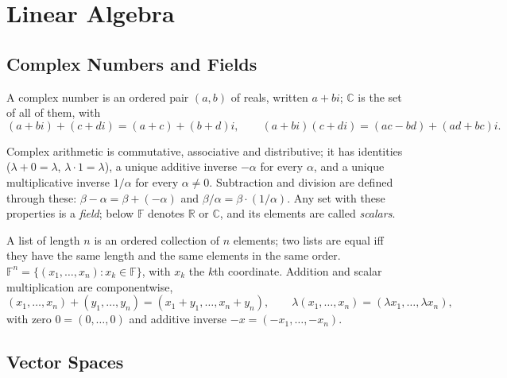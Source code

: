 \chapter{Linear Algebra}

\section{Complex Numbers and Fields}

\begin{definition}
A complex number is an ordered pair $(a,b)$ of reals, written $a+bi$; $\mathbb{C}$ is the set of all of them, with
\[
    (a+bi)+(c+di) = (a+c)+(b+d)i,\qquad (a+bi)(c+di) = (ac-bd)+(ad+bc)i .
\]
\end{definition}
Complex arithmetic is commutative, associative and distributive; it has identities ($\lambda+0=\lambda$, $\lambda\cdot1=\lambda$), a unique additive inverse $-\alpha$ for every $\alpha$, and a unique multiplicative inverse $1/\alpha$ for every $\alpha\neq0$. Subtraction and division are defined through these: $\beta-\alpha = \beta+(-\alpha)$ and $\beta/\alpha = \beta\cdot(1/\alpha)$. Any set with these properties is a \emph{field}; below $\mathbb{F}$ denotes $\mathbb{R}$ or $\mathbb{C}$, and its elements are called \emph{scalars}.

\begin{definition}
A list of length $n$ is an ordered collection of $n$ elements; two lists are equal iff they have the same length and the same elements in the same order. $\mathbb{F}^n = \{(x_1,\ldots,x_n) : x_k\in\mathbb{F}\}$, with $x_k$ the $k$th coordinate. Addition and scalar multiplication are componentwise,
\[
    (x_1,\ldots,x_n)+(y_1,\ldots,y_n) = (x_1+y_1,\ldots,x_n+y_n),\qquad \lambda(x_1,\ldots,x_n) = (\lambda x_1,\ldots,\lambda x_n),
\]
with zero $0 = (0,\ldots,0)$ and additive inverse $-x = (-x_1,\ldots,-x_n)$.
\end{definition}

\section{Vector Spaces}

